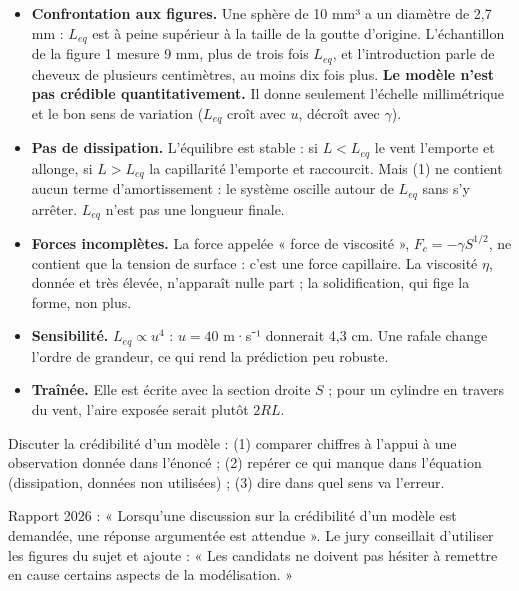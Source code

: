 \documentclass[11pt,a4paper]{article}
\providecommand{\tightlist}{\setlength{\itemsep}{0pt}\setlength{\parskip}{0pt}}
\begin{document}
\begin{itemize}
\tightlist
\item
  \textbf{Confrontation aux figures.} Une sphère de 10 mm³ a un diamètre de 2,7 mm : \(L_{eq}\) est à peine supérieur à la taille de la goutte d'origine. L'échantillon de la figure 1 mesure 9 mm, plus de trois fois \(L_{eq}\), et l'introduction parle de cheveux de plusieurs centimètres, au moins dix fois plus. \textbf{Le modèle n'est pas crédible quantitativement.} Il donne seulement l'échelle millimétrique et le bon sens de variation (\(L_{eq}\) croît avec \(u\), décroît avec \(\gamma\)).
\item
  \textbf{Pas de dissipation.} L'équilibre est stable : si \(L < L_{eq}\) le vent l'emporte et allonge, si \(L > L_{eq}\) la capillarité l'emporte et raccourcit. Mais (1) ne contient aucun terme d'amortissement : le système oscille autour de \(L_{eq}\) sans s'y arrêter. \(L_{eq}\) n'est pas une longueur finale.
\item
  \textbf{Forces incomplètes.} La force appelée « force de viscosité », \(F_c = -\gamma S^{1/2}\), ne contient que la tension de surface : c'est une force capillaire. La viscosité \(\eta\), donnée et très élevée, n'apparaît nulle part ; la solidification, qui fige la forme, non plus.
\item
  \textbf{Sensibilité.} \(L_{eq} \propto u^4\) : \(u = 40\) m·s⁻¹ donnerait 4,3 cm. Une rafale change l'ordre de grandeur, ce qui rend la prédiction peu robuste.
\item
  \textbf{Traînée.} Elle est écrite avec la section droite \(S\) ; pour un cylindre en travers du vent, l'aire exposée serait plutôt \(2RL\).
\end{itemize}

\begin{methode}

Discuter la crédibilité d'un modèle : (1) comparer chiffres à l'appui à une observation donnée dans l'énoncé ; (2) repérer ce qui manque dans l'équation (dissipation, données non utilisées) ; (3) dire dans quel sens va l'erreur.

\end{methode}

\begin{jury}

Rapport 2026 : « Lorsqu'une discussion sur la crédibilité d'un modèle est demandée, une réponse argumentée est attendue ». Le jury conseillait d'utiliser les figures du sujet et ajoute : « Les candidats ne doivent pas hésiter à remettre en cause certains aspects de la modélisation. »

\end{jury}
\end{document}
